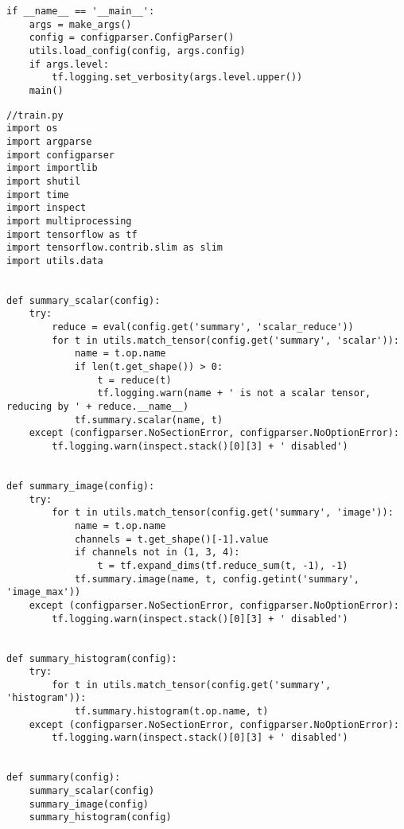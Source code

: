 \begin{lstlisting}
if __name__ == '__main__':
    args = make_args()
    config = configparser.ConfigParser()
    utils.load_config(config, args.config)
    if args.level:
        tf.logging.set_verbosity(args.level.upper())
    main()
\end{lstlisting}

\pagebreak
\begin{lstlisting}
//train.py
import os
import argparse
import configparser
import importlib
import shutil
import time
import inspect
import multiprocessing
import tensorflow as tf
import tensorflow.contrib.slim as slim
import utils.data


def summary_scalar(config):
    try:
        reduce = eval(config.get('summary', 'scalar_reduce'))
        for t in utils.match_tensor(config.get('summary', 'scalar')):
            name = t.op.name
            if len(t.get_shape()) > 0:
                t = reduce(t)
                tf.logging.warn(name + ' is not a scalar tensor, reducing by ' + reduce.__name__)
            tf.summary.scalar(name, t)
    except (configparser.NoSectionError, configparser.NoOptionError):
        tf.logging.warn(inspect.stack()[0][3] + ' disabled')


def summary_image(config):
    try:
        for t in utils.match_tensor(config.get('summary', 'image')):
            name = t.op.name
            channels = t.get_shape()[-1].value
            if channels not in (1, 3, 4):
                t = tf.expand_dims(tf.reduce_sum(t, -1), -1)
            tf.summary.image(name, t, config.getint('summary', 'image_max'))
    except (configparser.NoSectionError, configparser.NoOptionError):
        tf.logging.warn(inspect.stack()[0][3] + ' disabled')


def summary_histogram(config):
    try:
        for t in utils.match_tensor(config.get('summary', 'histogram')):
            tf.summary.histogram(t.op.name, t)
    except (configparser.NoSectionError, configparser.NoOptionError):
        tf.logging.warn(inspect.stack()[0][3] + ' disabled')


def summary(config):
    summary_scalar(config)
    summary_image(config)
    summary_histogram(config)



\end{lstlisting}
